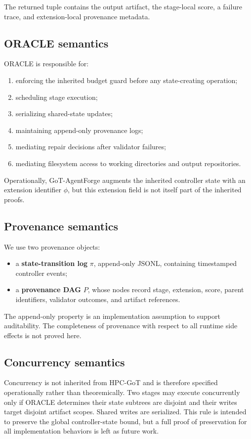 \documentclass[11pt,a4paper,oneside]{article}
\begin{document}
The returned tuple contains the output artifact, the stage-local score, a failure trace, and extension-local provenance metadata.

\subsection{ORACLE semantics}
ORACLE is responsible for:
\begin{enumerate}[leftmargin=2em]
    \item enforcing the inherited budget guard before any state-creating operation;
    \item scheduling stage execution;
    \item serializing shared-state updates;
    \item maintaining append-only provenance logs;
    \item mediating repair decisions after validator failures;
    \item mediating filesystem access to working directories and output repositories.
\end{enumerate}

Operationally, GoT-AgentForge augments the inherited controller state with an extension identifier $\phi$, but this extension field is not itself part of the inherited proofs.

\subsection{Provenance semantics}
We use two provenance objects:
\begin{itemize}[leftmargin=2em]
    \item a \textbf{state-transition log} $\pi$, append-only JSONL, containing timestamped controller events;
    \item a \textbf{provenance DAG} $P$, whose nodes record stage, extension, score, parent identifiers, validator outcomes, and artifact references.
\end{itemize}
The append-only property is an implementation assumption to support auditability. The completeness of provenance with respect to all runtime side effects is not proved here.

\subsection{Concurrency semantics}
Concurrency is not inherited from HPC-GoT and is therefore specified operationally rather than theoremically. Two stages may execute concurrently only if ORACLE determines their state subtrees are disjoint and their writes target disjoint artifact scopes. Shared writes are serialized. This rule is intended to preserve the global controller-state bound, but a full proof of preservation for all implementation behaviors is left as future work.
\end{document}
